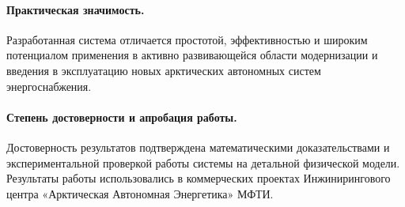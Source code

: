 
 \paragraph{Практическая значимость.}
 Разработанная система отличается простотой, эффективностью и широким потенциалом применения в активно развивающейся области модернизации и введения в эксплуатацию новых арктических автономных систем энергоснабжения.
 
 
 \paragraph{Степень достоверности и апробация работы.}
 Достоверность результатов подтверждена математическими доказательствами и экспериментальной проверкой работы системы на детальной физической модели. 
 Результаты работы использовались в коммерческих проектах Инжинирингового центра «Арктическая Автономная Энергетика» МФТИ.
 
 
 
 